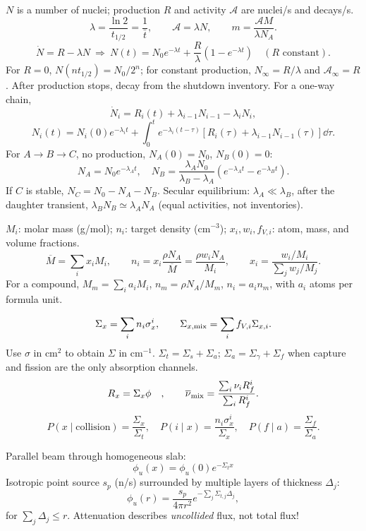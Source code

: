 \begin{handoutcolumns}
\vspace{0.25cm}
 $N$ is a number of nuclei; production
$R$ and activity $\mathcal A$ are nuclei/s and decays/s.
\[
 \lambda=\frac{\ln2}{t_{1/2}}=\frac1{\bar t},\qquad
 \mathcal A=\lambda N,\qquad m=\frac{\mathcal A M}{\lambda N_A}.
\]
\[
 \dot N=R-\lambda N\ \Longrightarrow\
 N(t)=N_0e^{-\lambda t}+\frac{R}{\lambda}(1-e^{-\lambda t})
 \quad(R\text{ constant}).
\]
For $R=0$, $N(nt_{1/2})=N_0/2^n$; for constant production,
$N_\infty=R/\lambda$ and $\mathcal A_\infty=R$. After production
stops, decay from the shutdown inventory.
For a one-way chain,
\[
 \dot N_i=R_i(t)+\lambda_{i-1}N_{i-1}-\lambda_iN_i,
\]
\[
 N_i(t)=N_i(0)e^{-\lambda_it}
 +\int_0^t e^{-\lambda_i(t-\tau)}
 [R_i(\tau)+\lambda_{i-1}N_{i-1}(\tau)]\dd\tau.
\]
For $A\to B\to C$, no production, $N_A(0)=N_0$, $N_B(0)=0$:
\[
 N_A=N_0e^{-\lambda_A t},\quad
 N_B=\frac{\lambda_AN_0}{\lambda_B-\lambda_A}
       (e^{-\lambda_A t}-e^{-\lambda_B t}).
\]
If $C$ is stable, $N_C=N_0-N_A-N_B$. Secular equilibrium:
$\lambda_A\ll\lambda_B$, after the daughter transient,
$\lambda_BN_B\simeq\lambda_AN_A$ (equal activities, not inventories).


\switchcolumn\RaggedRight
$M_i$: molar mass (g/mol); $n_i$: target density (cm$^{-3}$);
$x_i,w_i,f_{V,i}$: atom, mass, and volume fractions.
\[
 \overline M=\sum_i x_iM_i,\qquad
 n_i=x_i\frac{\rho N_A}{\overline M}
       =\frac{\rho w_iN_A}{M_i},\qquad
 x_i=\frac{w_i/M_i}{\sum_jw_j/M_j}.
\]
For a compound, $M_m=\sum_i a_iM_i$, $n_m=\rho N_A/M_m$,
$n_i=a_in_m$, with $a_i$ atoms per formula unit.


\[
 \Sigma_x=\sum_i n_i\sigma_x^i,\qquad
 \Sigma_{x,\rm mix}=\sum_i f_{V,i}\Sigma_{x,i}.
\]
Use $\sigma$ in cm$^2$ to obtain $\Sigma$ in cm$^{-1}$.
$\Sigma_t=\Sigma_s+\Sigma_a$; $\Sigma_a=\Sigma_\gamma+\Sigma_f$
when capture and fission are the only absorption channels.
\[
 R_x=\Sigma_x\phi\quad ,\qquad
 \overline\nu_{\rm mix}=\frac{\sum_i\nu_iR_f^i}{\sum_iR_f^i}.
\]
\[
 P(x\mid\mathrm{collision})=\frac{\Sigma_x}{\Sigma_t},\quad
 P(i\mid x)=\frac{n_i\sigma_x^i}{\Sigma_x},\quad
 P(f\mid a)=\frac{\Sigma_f}{\Sigma_a}.
\]

Parallel beam through homogeneous slab:
\[
\phi_u(x)=\phi_u(0)e^{-\Sigma_t x}
\]
Isotropic point source $s_p$ (n/s) surrounded by multiple layers of thickness $\Delta_j$:
\[
 \phi_u(r)=\frac{s_p}{4\pi r^2}e^{-\sum_j\Sigma_{t,j} \Delta_j},
\]
for $\sum_j \Delta_j \leq r$.
Attenuation describes \emph{uncollided} flux, not total flux!


\end{handoutcolumns}
